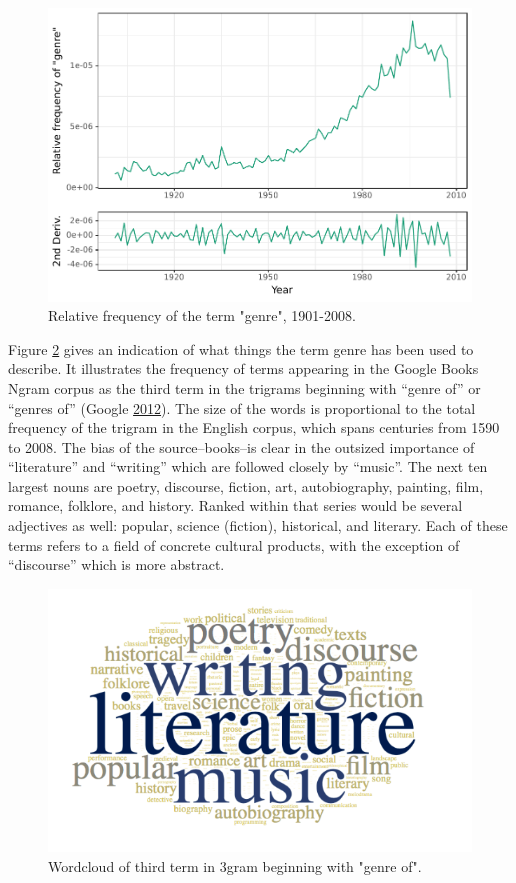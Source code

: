 \documentclass[]{book}
\theoremstyle{definition}
\theoremstyle{definition}
\theoremstyle{definition}
\theoremstyle{remark}
\begin{document}
\begin{figure}

{\centering \includegraphics[width=0.9\linewidth]{03_files/figure-latex/ttsgnr2-1} 

}

\caption{Relative frequency of the term "genre", 1901-2008.}\label{fig:ttsgnr2}
\end{figure}

Figure \ref{fig:genre-goog} gives an indication of what things the term
genre has been used to describe. It illustrates the frequency of terms
appearing in the Google Books Ngram corpus as the third term in the
trigrams beginning with ``genre of'' or ``genres of'' (Google
\protect\hyperlink{ref-2012Google}{2012}). The size of the words is
proportional to the total frequency of the trigram in the English
corpus, which spans centuries from 1590 to 2008. The bias of the
source--books--is clear in the outsized importance of ``literature'' and
``writing'' which are followed closely by ``music''. The next ten
largest nouns are poetry, discourse, fiction, art, autobiography,
painting, film, romance, folklore, and history. Ranked within that
series would be several adjectives as well: popular, science (fiction),
historical, and literary. Each of these terms refers to a field of
concrete cultural products, with the exception of ``discourse'' which is
more abstract.

\begin{figure}

{\centering \includegraphics[width=0.9\linewidth]{img/genre-goog} 

}

\caption{Wordcloud of third term in 3gram beginning with "genre of".}\label{fig:genre-goog}
\end{figure}
\end{document}
